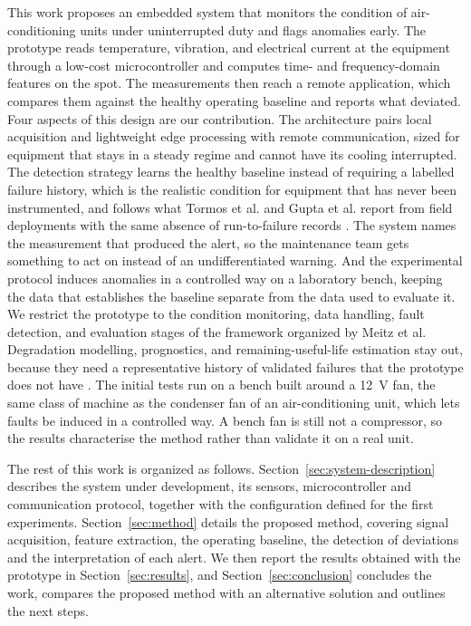 \documentclass[english,hidelinks]{sbrt}
\begin{document}
This work proposes an embedded system that monitors the condition of air-conditioning units under uninterrupted duty and flags anomalies early. The prototype reads temperature, vibration, and electrical current at the equipment through a low-cost microcontroller and computes time- and frequency-domain features on the spot. The measurements then reach a remote application, which compares them against the healthy operating baseline and reports what deviated. Four aspects of this design are our contribution. The architecture pairs local acquisition and lightweight edge processing with remote communication, sized for equipment that stays in a steady regime and cannot have its cooling interrupted. The detection strategy learns the healthy baseline instead of requiring a labelled failure history, which is the realistic condition for equipment that has never been instrumented, and follows what Tormos et al. and Gupta et al. report from field deployments with the same absence of run-to-failure records \cite{tormos2026hvacxai,gupta2023baggage}. The system names the measurement that produced the alert, so the maintenance team gets something to act on instead of an undifferentiated warning. And the experimental protocol induces anomalies in a controlled way on a laboratory bench, keeping the data that establishes the baseline separate from the data used to evaluate it. We restrict the prototype to the condition monitoring, data handling, fault detection, and evaluation stages of the framework organized by Meitz et al. Degradation modelling, prognostics, and remaining-useful-life estimation stay out, because they need a representative history of validated failures that the prototype does not have \cite{meitz2025pdmframework}. The initial tests run on a bench built around a 12~V fan, the same class of machine as the condenser fan of an air-conditioning unit, which lets faults be induced in a controlled way. A bench fan is still not a compressor, so the results characterise the method rather than validate it on a real unit.

The rest of this work is organized as follows. Section~\ref{sec:system-description} describes the system under development, its sensors, microcontroller and communication protocol, together with the configuration defined for the first experiments. Section~\ref{sec:method} details the proposed method, covering signal acquisition, feature extraction, the operating baseline, the detection of deviations and the interpretation of each alert. We then report the results obtained with the prototype in Section~\ref{sec:results}, and Section~\ref{sec:conclusion} concludes the work, compares the proposed method with an alternative solution and outlines the next steps.
\end{document}
